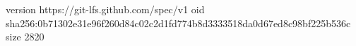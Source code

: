 version https://git-lfs.github.com/spec/v1
oid sha256:0b71302e31e96f260d84c02c2d1fd774b8d3333518da0d67ed8c98bf225b536c
size 2820
